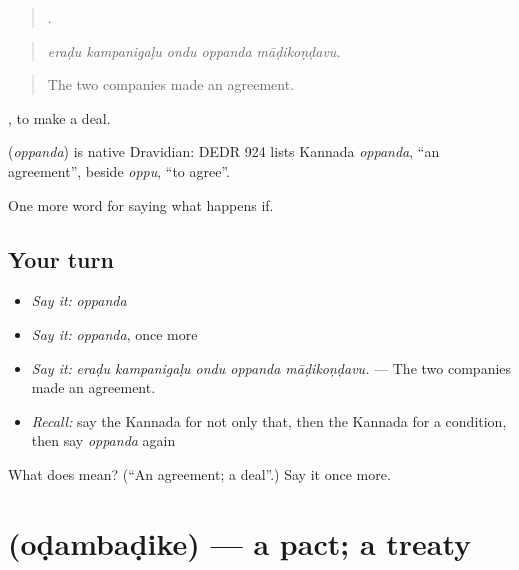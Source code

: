 \begin{quote}
    .
\end{quote}

\begin{quote}
\emph{eraḍu kampanigaḷu ondu oppanda māḍikoṇḍavu.}
\end{quote}

\begin{quote}
The two companies made an agreement.
\end{quote}

 , to make a deal.

\begin{cousinweb}
\textbf{} (\emph{oppanda}) is native Dravidian: DEDR 924 lists Kannada \emph{oppanda}, \textquotedblleft{}an agreement\textquotedblright{}, beside \emph{oppu}, \textquotedblleft{}to agree\textquotedblright{}.
\end{cousinweb}

\begin{grammarlens}[title={What you've built}]
One more word for saying what happens if.
\end{grammarlens}

\subsection*{Your turn}
\begin{itemize}
\raggedright
  \item \emph{Say it:} \emph{oppanda}
  \item \emph{Say it:} \emph{oppanda}, once more
  \item \emph{Say it:} \emph{eraḍu kampanigaḷu ondu oppanda māḍikoṇḍavu.} — The two companies made an agreement.
  \item \emph{Recall:} say the Kannada for not only that, then the Kannada for a condition, then say \emph{oppanda} again
\end{itemize}

\begin{tcolorbox}[breakable,colback=teal!4,colframe=teal!35!black,title={Before you move on}]
What does  mean? (\textquotedblleft{}An agreement; a deal\textquotedblright{}.) Say it once more.
\end{tcolorbox}
\section[\texorpdfstring{\kn{ಒಡಂಬಡಿಕೆ} (oḍambaḍike)}{ಒಡಂಬಡಿಕೆ (oḍambaḍike)}]{ (oḍambaḍike) — a pact; a treaty}

